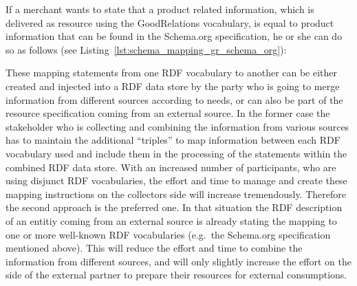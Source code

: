 If a merchant wants to state that a product related information, which is delivered as resource using the GoodRelations vocabulary, is equal to product information that can be found in the Schema.org specification, he or she can do so as follows (see Listing~\ref{lst:schema_mapping_gr_schema_org}): \@


These mapping statements from one \gls{RDF} vocabulary to another can be either created and injected into a \gls{RDF} data store by the party who is going to merge information from different sources according to needs, or can also be part of the resource specification coming from an external source. In the former case the stakeholder who is collecting and combining the information from various sources has to maintain the additional ``triples'' to map information between each \gls{RDF} vocabulary used and include them in the processing of the statements within the combined \gls{RDF} data store. With an increased number of participants, who are using disjunct \gls{RDF} vocabularies, the effort and time to manage and create these mapping instructions on the collectors side will increase tremendously. Therefore the second approach is the preferred one. In that situation the \gls{RDF} description of an entitiy coming from an external source is already stating the mapping to one or more well-known \gls{RDF} vocabularies (e.g.\ the Schema.org specification mentioned above). This will reduce the effort and time to combine the information from different sources, and will only slightly increase the effort on the side of the external partner to prepare their resources for external consumptions.


